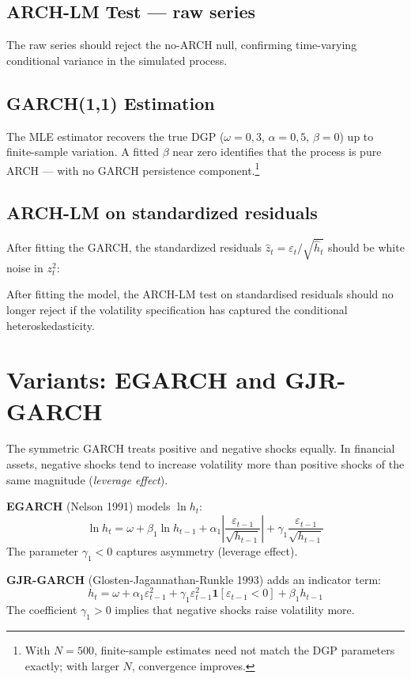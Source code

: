 \subsection*{ARCH-LM Test — raw series}

The raw series should reject the no-ARCH null, confirming time-varying
conditional variance in the simulated process.

\subsection*{GARCH(1,1) Estimation}

The MLE estimator recovers the true DGP ($\omega=0{,}3$, $\alpha=0{,}5$,
$\beta=0$) up to finite-sample variation. A fitted $\beta$ near zero identifies
that the process is pure ARCH — with no GARCH persistence component.\footnote{%
  With $N=500$, finite-sample estimates need not match the DGP parameters
  exactly; with larger $N$, convergence improves.}

\subsection*{ARCH-LM on standardized residuals}

After fitting the GARCH, the standardized residuals $\hat{z}_t = \varepsilon_t / \sqrt{\hat{h}_t}$
should be white noise in $z_t^2$:

After fitting the model, the ARCH-LM test on standardised residuals should no
longer reject if the volatility specification has captured the conditional
heteroskedasticity.

\section{Variants: EGARCH and GJR-GARCH}

The symmetric GARCH treats positive and negative shocks equally. In
financial assets, negative shocks tend to increase volatility more
than positive shocks of the same magnitude (\emph{leverage effect}).

\textbf{EGARCH} (Nelson 1991) models $\ln h_t$:
\[
  \ln h_t = \omega + \beta_1 \ln h_{t-1}
             + \alpha_1 \left|\frac{\varepsilon_{t-1}}{\sqrt{h_{t-1}}}\right|
             + \gamma_1 \frac{\varepsilon_{t-1}}{\sqrt{h_{t-1}}}
\]
The parameter $\gamma_1 < 0$ captures asymmetry (leverage effect).

\textbf{GJR-GARCH} (Glosten-Jagannathan-Runkle 1993) adds an indicator term:
\[
  h_t = \omega + \alpha_1 \varepsilon_{t-1}^2
        + \gamma_1 \varepsilon_{t-1}^2 \mathbf{1}[\varepsilon_{t-1} < 0]
        + \beta_1 h_{t-1}
\]
The coefficient $\gamma_1 > 0$ implies that negative shocks raise volatility more.


